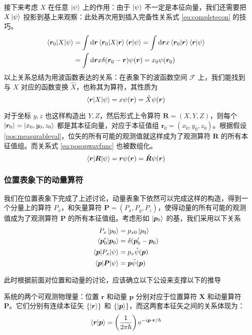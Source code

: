 \documentclass[cn,10pt,math=newtx,citestyle=gb7714-2015,bibstyle=gb7714-2015]{elegantbook}
\def\bm{\boldsymbol}
\def\mc{\mathcal}
\def\d{\mathrm d}
\def\e{\mathrm e}
\def\td{\tilde}
\begin{document}
接下来考虑 $X$ 在任意 $\ket{\psi}$ 上的作用：由于 $\ket{\psi}$ 不一定是本征向量，我们还需要把 $X\ket{\psi}$ 投影到基上来观察：此处再次用到插入完备性关系式 \ref{eq:completecon} 的技巧。
\begin{align*}
   \braket{\bm r_0|X|\psi}&=\int\d\bm r\braket{\bm r_0|X|\bm r}\braket{\bm r|\psi}=\int\d\bm r x\braket{\bm r_0|\bm r}\braket{\bm r|\psi}\\
   & =\int\d\bm r x\delta(\bm r_0-\bm r)\psi(\bm r)=x_0\psi(\bm r_0)
\end{align*}
以上关系总结为用波函数表达的关系：在表象下的波函数空间 $\mc F$ 上，我们能找到与 $X$ 对应的函数变换 $\hat X$，也称其为算符，其性质为
\begin{equation}
   \label{eq:posopwavfuncx}
   \braket{\bm r|X|\psi}=x\psi(\bm r)=\hat X\psi(\bm r)
\end{equation}

对于坐标 $y,z$ 也这样构造出 $Y,Z$，然后形式上令算符 $\bm R=(X,Y,Z)$，则每个 $\ket{\bm r_0}=\ket{x_0,y_0,z_0}$ 都是其本征向量，对应于本征值组 $\bm r_0 = (x_0,y_0,z_0)$。根据假设 \ref{pos:measurableval}，位矢的所有可能的观测值就这样成为了观测算符 $\bm R$ 的所有本征值组。而关系式 \ref{eq:posopwavfunc} 也被数组化。
\begin{equation}
   \label{eq:posopwavfunc}
   \braket{\bm r|\bm R|\psi}=\bm r\psi(\bm r)=\hat{\bm R}\psi(\bm r)
\end{equation}

\subsubsection{位置表象下的动量算符}
我们在位置表象下完成了上述讨论，动量表象下依然可以完成这样的构造，得到一个分量上的算符 $P_x$，和矢量算符 $\bm P=(P_x,P_y,P_z)$，使得动量的所有可能的观测值成为了观测算符 $\bm P$ 的所有本征值组。考虑形如 $\ket{\bm p_0}$ 的基，我们采用以下关系
\begin{align}
   P_x\ket{p_0}&=p_{x0}\ket{p_0}\\
   \braket{\bm p_0'|\bm p_0}&=\delta(\bm p_0'-\bm p_0)\\
   \braket{\bm p|P_x|\psi}&=p_x\td\psi(\bm p)\\
   \braket{\bm p|\bm P|\psi}&=\bm p\td\psi(\bm p)
\end{align}

此时根据前面对位置和动量的讨论，应该确立以下公设来支撑以下的推导
\begin{postulate}[位置与动量本征态的关系]
    系统的两个可观测物理量：位置 $\bm r$ 和动量 $\bm p$ 分别对应于位置算符 $\bm X$ 和动量算符 $\bm P$。它们分别有连续本征矢 $\{\ket{\bm r}\}$ 和 $\{\ket{\bm p}\}$，而这两套本征矢之间的关系体现为：
    \begin{equation}
        \braket{\bm r|\bm p} = \left(\frac 1{2\pi\hbar}\right)\e^{-i\bm p\cdot\bm r/\hbar}
    \end{equation}
\end{postulate}
\end{document}
